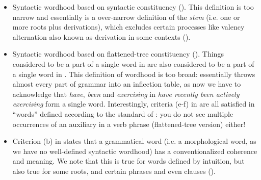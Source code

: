 \documentclass[a4paper, oneside, scheme=plain, 12pt]{article}
\newcommand*{\citepage}[1]{p.~{#1}}
\newcommand*{\citepages}[1]{pp.~{#1}}
\newcommand*{\term}[1]{\emph{#1}}
\newcommand{\form}[1]{\emph{#1}}
\begin{document}
\begin{itemize}
    \item Syntactic wordhood based on syntactic constituency ().
    This definition is too narrow and essentially is a over-narrow definition of the \term{stem}
    (i.e. one or more roots plus derivations),
    which excludes certain processes like valency alternation also known as derivation in some contexts
    ().

    \item Syntactic wordhood based on flattened-tree constituency ().
    Things considered to be a part of a single word in 
    are also considered to be a part of a single word in .
    This definition of wordhood is too broad:
    essentially throws almost every part of grammar into an inflection table,
    as now we have to acknowledge that \form{have}, \form{been} and \form{exercising} in \form{have recently been actively exercising} form a single word.
    Interestingly, criteria (e-f) in \citet[\citepages{15-16}]{dixon2010basic2} are all satisfied in ``words'' defined according to the standard of :
    you do not see multiple occurrences of an auxiliary in a verb phrase (flattened-tree version) either!

    \item Criterion (b) in \citet[\citepage{13}]{dixon2010basic2} states that a grammatical word  (i.e. a morphological word, as we have no well-defined syntactic wordhood)
    has a conventionalized coherence and meaning.
    We note that this is true for words defined by intuition,
    but also true for some roots, and certain phrases and even clauses
    ().


\end{itemize}
\end{document}

